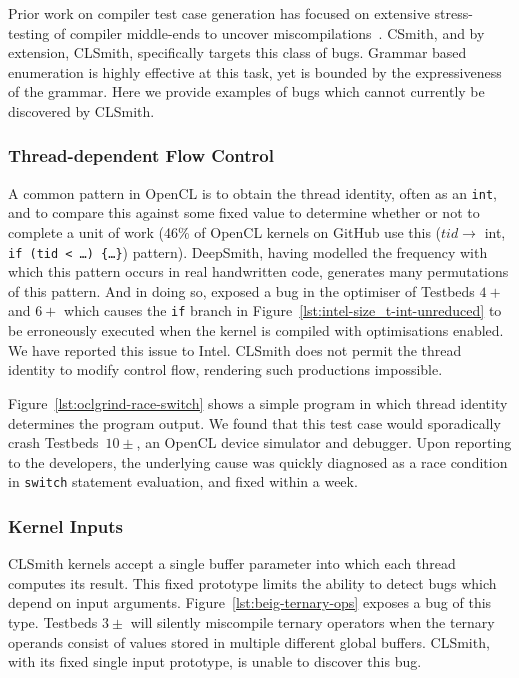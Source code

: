 Prior work on compiler test case generation has focused on extensive stress-
testing of compiler middle-ends to uncover miscompilations~\cite{Chen2014a}.
CSmith, and by extension, CLSmith, specifically targets this class of bugs.
Grammar based enumeration is highly effective at this task, yet is bounded by
the expressiveness of the grammar. Here we provide examples of bugs which cannot
currently be discovered by CLSmith.

\subsubsection{Thread-dependent Flow Control}

A common pattern in OpenCL is to obtain the thread identity, often as an
\texttt{int}, and to compare this against some fixed value to determine whether
or not to complete a unit of work (46\% of OpenCL kernels on GitHub use this
($tid \rightarrow$ int, \texttt{if (tid < \ldots) \{\ldots\}}) pattern).
DeepSmith, having modelled the frequency with which this pattern occurs in real
handwritten code, generates many permutations of this pattern. And in doing so,
exposed a bug in the optimiser of Testbeds $4+$ and $6+$ which causes the
\texttt{if} branch in Figure~\ref{lst:intel-size_t-int-unreduced} to be
erroneously executed when the kernel is compiled with optimisations enabled. We
have reported this issue to Intel. CLSmith does not permit the thread identity
to modify control flow, rendering such productions impossible.

Figure~\ref{lst:oclgrind-race-switch} shows a simple program in which thread
identity determines the program output. We found that this test case would
sporadically crash Testbeds~$10\pm$, an OpenCL device simulator and debugger.
Upon reporting to the developers, the underlying cause was quickly diagnosed as
a race condition in \texttt{switch} statement evaluation, and fixed within a
week.

\subsubsection{Kernel Inputs}

CLSmith kernels accept a single buffer parameter into which each thread computes
its result. This fixed prototype limits the ability to detect bugs which depend
on input arguments. Figure~\ref{lst:beig-ternary-ops} exposes a bug of this
type. Testbeds $3\pm$ will silently miscompile ternary operators when the
ternary operands consist of values stored in multiple different global buffers.
CLSmith, with its fixed single input prototype, is unable to discover this bug.

